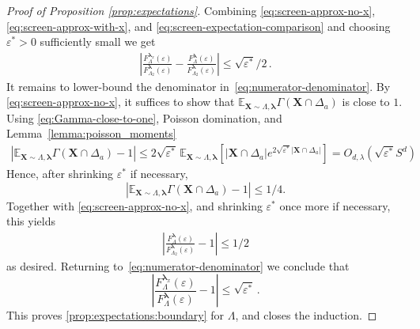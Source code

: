\documentclass[10pt]{amsart}
\theoremstyle{definition}
\theoremstyle{remark}
\newcommand{\bX}{\mathbf{X}}
\newcommand{\E}{\mathbb{E}}
\newcommand{\region}{\Lambda}
\newcommand{\activities}{\pmb{\lambda}}
\newcommand{\absolute}[1]{\left\lvert#1\right\rvert}
\newcommand{\epsbound}{\varepsilon^{*}}
\begin{document}
\begin{proof}[Proof of Proposition \ref{prop:expectations}]
		
		Combining \eqref{eq:screen-approx-no-x},
		\eqref{eq:screen-approx-with-x}, and
		\eqref{eq:screen-expectation-comparison} and choosing
		\(\epsbound>0\) sufficiently small we get
		\begin{align*}
			\absolute{
				\frac{F_{\region}^{\activities_x}(\varepsilon)}{F_{\region_2}^{\activities}(\varepsilon)}
				-
				\frac{F_{\region}^{\activities}(\varepsilon)}{F_{\region_2}^{\activities}(\varepsilon)}
			}
			\le\sqrt{\epsbound}/2\, .
		\end{align*}
		It remains to lower-bound the denominator in~\eqref{eq:numerator-denominator}.
		By \eqref{eq:screen-approx-no-x}, it suffices to show that
		\(
		\E_{\bX\sim\region,\activities}
		\Gamma(\bX\cap\Delta_a)
		\)
		is close to \(1\). Using \eqref{eq:Gamma-close-to-one}, Poisson domination, and Lemma~\ref{lemma:poisson_moments}
		\begin{align*}
			\absolute{
				\E_{\bX\sim\region,\activities}
				\Gamma(\bX\cap\Delta_a)
				-1
			}
			\le
			2\sqrt{\epsbound}\,
			\E_{\bX\sim\region,\activities}
			\left[
			\absolute{\bX\cap\Delta_a}e^{2\sqrt{\epsbound} \absolute{\bX\cap\Delta_a}}
			\right]
			=O_{d,\lambda}(\sqrt{\epsbound}S^d)
		\end{align*}
		Hence, after shrinking \(\epsbound\) if necessary,
		\[
		\absolute{
			\E_{\bX\sim\region,\activities}
			\Gamma(\bX\cap\Delta_a)
			-1
		}
		\le
		1/4.
		\]
		Together with \eqref{eq:screen-approx-no-x}, and shrinking \(\epsbound\) once
		more if necessary, this yields
		\begin{align*}
			\absolute{
				\frac{F_{\region}^{\activities}(\varepsilon)}
				{F_{\region_2}^{\activities}(\varepsilon)}
				-1
			}
			\le
			1/2
		\end{align*}
		as desired. Returning to~\eqref{eq:numerator-denominator} we conclude that 
		\[
		\absolute{
			\frac{F_{\region}^{\activities_x}(\varepsilon)}
			{F_{\region}^{\activities}(\varepsilon)}
			-1
		}
		\le
		\sqrt{\epsbound}
		\, .
		\]
		This proves \ref{prop:expectations:boundary} for \(\region\), and closes the
		induction. \end{proof}
	
	
	
	
	
	
	
	
	
	
\end{document}
